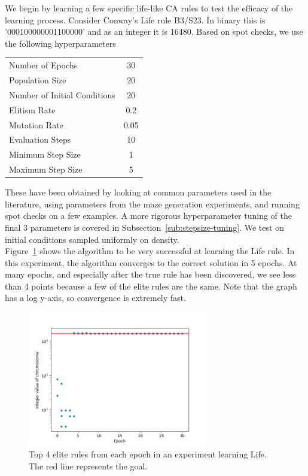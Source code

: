 We begin by learning a few specific life-like CA rules to test the efficacy of the learning process. Consider Conway's Life rule B3/S23. In binary this is '000100000001100000' and as an integer it is 16480. Based on spot checks, we use the following hyperparameters\\ 
\begin{center}\label{tab:hyperparams}
    \begin{tabular}{ l c }
        Number of Epochs & 30\\
        Population Size & 20\\
        Number of Initial Conditions & 20\\
        Elitism Rate & 0.2\\
        Mutation Rate & 0.05\\
        Evaluation Steps & 10\\
        Minimum Step Size & 1\\
        Maximum Step Size & 5\\
    \end{tabular}
\end{center}
These have been obtained by looking at common parameters used in the literature, using parameters from the maze generation experiments, and running spot checks on a few examples. A more rigorous hyperparameter tuning of the final 3 parameters is covered in Subsection~\ref{sub:stepsize-tuning}. We test on initial conditions sampled uniformly on density.\\ 

Figure~\ref{fig:life-convgraph} shows the algorithm to be very successful at learning the Life rule. In this experiment, the algorithm converges to the correct solution in 5 epochs. At many epochs, and especially after the true rule has been discovered, we see less than 4 points because a few of the elite rules are the same. Note that the graph has a log y-axis, so convergence is extremely fast.\\

\begin{figure}[!h]
\centering
\includegraphics[width=0.7\textwidth]{images/life_like_eval/life-convgraph.png}
\caption{Top 4 elite rules from each epoch in an experiment learning Life. The red line represents the goal.}
\label{fig:life-convgraph}
\end{figure}

